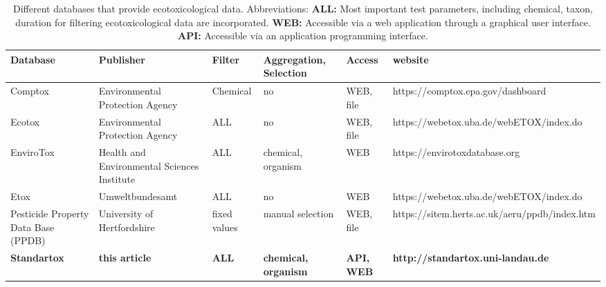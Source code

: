 

\begin{sidewaystable}
\caption{Different databases that provide ecotoxicological data. Abbreviations: \textbf{ALL:} Most important test parameters, including chemical, taxon, duration for filtering ecotoxicological data are incorporated. \textbf{WEB:} Accessible via a web application through a graphical user interface. \textbf{API:} Accessible via an application programming interface.}
\label{tab:database-differences}
\begin{tabular}{|m{3cm}|m{3cm}|m{2cm}|m{2cm}|m{1cm}|l|}
\hline
Database & Publisher & Filter & Aggregation, Selection & Access & website \\
\hline
Comptox & Environmental Protection Agency & Chemical & no & WEB, file & https://comptox.epa.gov/dashboard \\
\hline
Ecotox & Environmental Protection Agency & ALL & no & WEB, file & https://webetox.uba.de/webETOX/index.do \\
\hline
EnviroTox & Health and Environmental Sciences Institute & ALL & chemical, organism & WEB & https://envirotoxdatabase.org \\
\hline
Etox & Umweltbundesamt & ALL & no & WEB & https://webetox.uba.de/webETOX/index.do \\
\hline
Pesticide Property Data Base (PPDB) & University of Hertfordshire & fixed values & manual selection & WEB, file & https://sitem.herts.ac.uk/aeru/ppdb/index.htm \\
\hline
\textbf{Standartox} & \textbf{this article} & \textbf{ALL} & \textbf{chemical, organism} & \textbf{API, WEB} & \textbf{http://standartox.uni-landau.de} \\
\hline
\end{tabular}
\end{sidewaystable}


